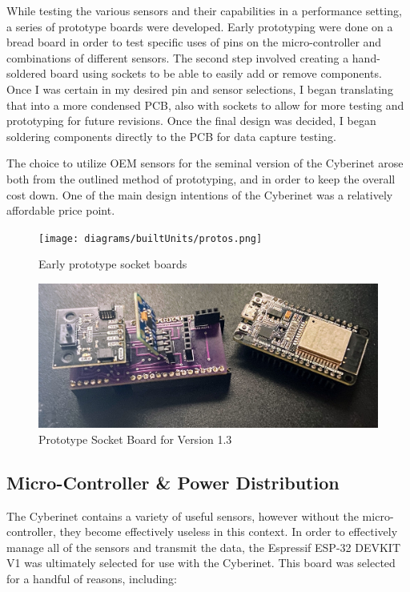 While testing the various sensors and their capabilities in a performance setting, a series of prototype boards were developed. Early prototyping were done on a bread board in order to test specific uses of pins on the micro-controller and combinations of different sensors. The second step involved creating a hand-soldered board using sockets to be able to easily add or remove components. Once I was certain in my desired pin and sensor selections, I began translating that into a more condensed PCB, also with sockets to allow for more testing and prototyping for future revisions. Once the final design was decided, I began soldering components directly to the PCB for data capture testing.

The choice to utilize OEM sensors for the seminal version of the Cyberinet arose both from the outlined method of prototyping, and in order to keep the overall cost down. One of the main design intentions of the Cyberinet was a relatively affordable price point. 

\begin{figure}
    \centering
    \texttt{[image: diagrams/builtUnits/protos.png]}
    \caption{Early prototype socket boards}
    \label{fig:protoBoard}
\end{figure}


\begin{figure}
    \centering
    \includegraphics[scale=0.15]{diagrams/builtUnits/protoBoard.JPG}
    \caption{Prototype Socket Board for Version 1.3}
    \label{fig:protoBoard2}
\end{figure}

\subsection{Micro-Controller \& Power Distribution}

The Cyberinet contains a variety of useful sensors, however without the micro-controller, they become effectively useless in this context. In order to effectively manage all of the sensors and transmit the data, the Espressif ESP-32 DEVKIT V1 was ultimately selected for use with the Cyberinet. This board was selected for a handful of reasons, including:

